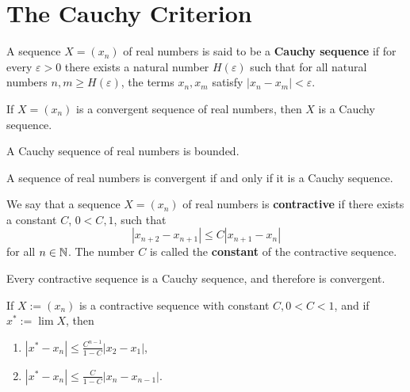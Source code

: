 \section{The Cauchy Criterion}

\begin{theorem}
	A sequence $X=(x_n)$ of real numbers is said to be a \textbf{Cauchy sequence} if for every $\varepsilon >0$ there exists a natural number $H(\varepsilon)$ such that for all natural numbers $n,m \geq H(\varepsilon)$, the terms $x_n, x_m$ satisfy $|x_n-x_m| < \varepsilon$.
\end{theorem}

\begin{lemma}
	If $X=(x_n)$ is a convergent sequence of real numbers, then $X$ is a Cauchy sequence.
\end{lemma}

\begin{lemma}
	A Cauchy sequence of real numbers is bounded.
\end{lemma}

\begin{theorem}
	A sequence of real numbers is convergent if and only if it is a Cauchy sequence.
\end{theorem}

\begin{definition}
	We say that a sequence $X=(x_n)$ of real numbers is \textbf{contractive} if there exists a constant $C$, $0<C,1$, such that
	\[|x_{n+2}-x_{n+1}| \leq C|x_{n+1}-x_n|\]
	for all $n \in \mathbb{N}$. The number $C$ is called the \textbf{constant} of the contractive sequence.
\end{definition}

\begin{theorem}
	Every contractive sequence is a Cauchy sequence, and therefore is convergent.
\end{theorem}

\begin{corollary}
	If $X:=(x_n)$ is a contractive sequence with constant $C, 0<C<1$, and if $x^*:= \lim X$, then
	\begin{enumerate}
		\item $|x^*-x_n| \leq \frac{C^{n-1}}{1-C}|x_2-x_1|$,

		\item $|x^*-x_n| \leq \frac{C}{1-C}|x_n-x_{n-1}|$.
	\end{enumerate}
\end{corollary}
